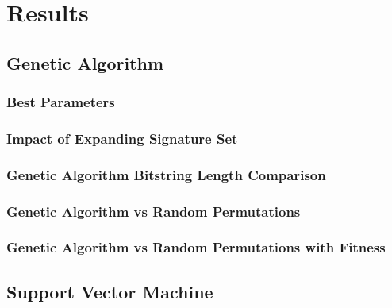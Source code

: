 \chapter{Results}

\section{Genetic Algorithm}

\subsection{Best Parameters}

\subsection{Impact of Expanding Signature Set}

\subsection{Genetic Algorithm Bitstring Length Comparison}

\subsection{Genetic Algorithm vs Random Permutations}

\subsection{Genetic Algorithm vs Random Permutations with Fitness}

\section{Support Vector Machine}

